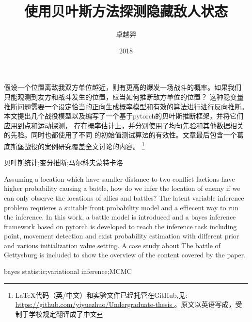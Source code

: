 \documentclass{sicnuthesis}
\title{使用贝叶斯方法探测隐藏敌人状态}
\author{卓越羿}
\date{2018}
\begin{document}
\frontmatter %

\maketitle

\clearpage

\begin{abstractch}

假设一个位置离敌我双方单位越近，则有更高的爆发一场战斗的概率。如果我们
只能观测到友方和战斗发生的位置，应当如何推断敌方单位的位置？
这种隐变量推断问题需要一个设定恰当的正向生成概率模型和有效的算法进行进行反向推断。
本文提出几个战役模型以及编写了一个基于pytorch的贝叶斯推断框架，并将它们应用到点和运动探测，
存在概率估计上，并分别使用了均匀先验和其他数据相关的先验。同时也都使用了不同
的初始值测试算法的有效性。文章最后包含一个葛底斯堡战役的案例研究覆盖全文讨论的内容。
\footnote{LaTeX代码（英/中文）和实验文件已经托管在GitHub,见: \url{ https://github.com/yiyuezhuo/Undergraduate-thesis } 。原文以英语写成，受制于学校规定翻译成了中文}

\end{abstractch}

\begin{keywordsch}贝叶斯统计;变分推断;马尔科夫蒙特卡洛\end{keywordsch}

\clearpage


\begin{abstracten}

Assuming a location which have samller distance to two conflict factions have higher probability causing a battle,
how do we infer the location of enemy if we can only observe the locations of allies and battles? 
The latent variable inference problem requieres a suitable front probability model and a effiecent way to run the 
inference. In this work, a battle model is introduced and a bayes inference framework based on pytorch 
is developed to reach the inference task including point, movement detection and 
exist probability estimation with different prior and various initialization value setting.
A case study about The battle of Gettysburg is included to show the overview of the content covered by the paper.

\end{abstracten}

\begin{keywordsen}bayes statistic;variational inference;MCMC\end{keywordsen}
\end{document}
